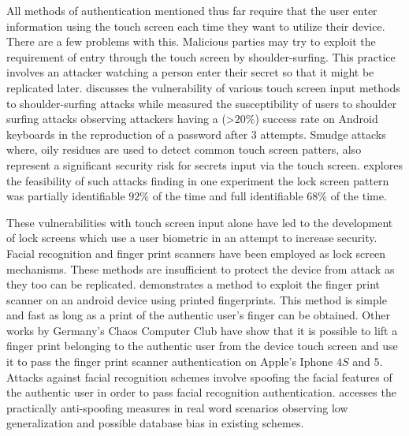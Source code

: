 All methods of authentication mentioned thus far
require that the user enter information 
using the touch screen
each time they want to utilize their device.
%
There are a few problems with this.
Malicious parties may try to 
exploit the requirement of entry through the
touch screen by
shoulder-surfing.
This practice involves an attacker
watching a person enter their secret 
so that it might be replicated later.
%
\cite{hafiz2008towards} discusses the vulnerability of
various touch screen input methods to shoulder-surfing attacks
while
\cite{schaub2012password} measured the susceptibility of 
users to shoulder surfing attacks observing
attackers having a (\textgreater$20\%$) success rate
on Android keyboards
in the reproduction of a password after $3$ attempts.
%
Smudge attacks where,
oily residues are used to detect common touch screen patters,
also represent a significant security risk
for secrets input via the touch screen.
\cite{aviv2010smudge} explores the feasibility of
such attacks finding in one experiment
the lock screen pattern was 
partially identifiable $92\%$ of the time
and full identifiable $68\%$ of the time.

These vulnerabilities 
with touch screen input alone
have led to the development of 
lock screens which 
use a user biometric in an attempt to increase security.
Facial recognition and finger print scanners have
been employed as lock screen mechanisms.
These methods are insufficient to protect the device from attack
as they too can be replicated.
%
\cite{cao2016hacking} demonstrates a method 
to exploit the finger print scanner on an android device
using printed fingerprints.
This method is simple and fast as long as a print of the
authentic user's finger can be obtained.
%
Other works by Germany's Chaos Computer Club \cite{CHAOS}
have show that it is possible to lift a finger print 
belonging to the authentic user from the device touch screen
and use it to pass the finger print scanner authentication on Apple's Iphone $4S$ and $5$. 
%
Attacks against facial recognition schemes involve
spoofing the facial features of the authentic user
in order to pass facial recognition authentication.
\cite{de2013can}
accesses the practically anti-spoofing measures in real word scenarios
observing 
low generalization
and possible database bias in existing schemes.

